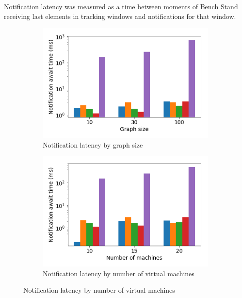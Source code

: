 Notification latency was measured as a time between moments of Bench Stand receiving last elements in tracking windows and notifications for that window.

\begin{figure}[t!]
    \begin{subfigure}[b]{0.32\textwidth}
            \includegraphics[width=0.99\textwidth]{pics/notification_await_time_by_graph_size_bars.png}
            \caption{Notification latency by graph size}
    \end{subfigure}
    \hspace{5mm}
    \begin{subfigure}[b]{0.32\textwidth}
            \includegraphics[width=0.99\textwidth]{pics/notification_await_time_by_number_of_machines_bars.png}
            \caption{Notification latency by number of virtual machines}

\end{subfigure}
\end{figure}
